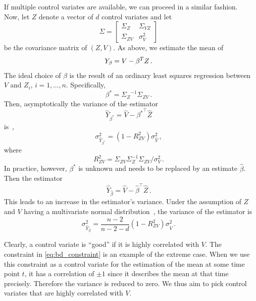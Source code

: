 If multiple control variates are available, we can proceed in a similar fashion.
Now, let ${Z}$ denote a vector of $d$ control variates and let
\[
\Sigma=
\begin{bmatrix}
\Sigma_{ Z} & \Sigma_{V Z}\\
\Sigma_{ Z V} & \sigma_V^2
\end{bmatrix}
\]
be the covariance matrix of $({Z},V)$.
As above, we estimate the mean of
\[
    {Y}_{\beta}=V -{\beta}^{T}{Z}\,.
    \]
The ideal choice of $\beta$ is the result of an ordinary least squares regression between $V$
and $Z_i$, $i=1,\dots,n$.
Specifically,
\[
	\beta^{*}={\Sigma_{ Z}}^{-1}{\Sigma}_{ Z V}\,.
\]
Then, asymptotically
the variance of the estimator
\begin{equation}
\hat{Y}_{{\beta^*}}=\hat{V}-{\beta^*}^{\top}\hat{ Z}
\end{equation}
is~\parencite{szechtman2003control},
\begin{equation}\label{eq:lcv_asym}
    {\sigma_{\hat Y_{\beta^*}}^2} = (1 - R_{ Z V}^2){\sigma_{\hat V}^2}\,,
\end{equation}
where
\begin{equation*}
    R_{ Z V}^2=\Sigma_{ Z V}\Sigma_{ Z}^{-1}\Sigma_{ Z V} / \sigma_V^2\,.
\end{equation*}
In practice, however, $\beta^*$ is unknown and needs to be replaced by
an estimate $\hat{\beta}$.
Then the estimator
\begin{equation}
\hat{Y}_{\hat{\beta}}=\hat{V}-\hat{\beta}^{\top}\hat{ Z}\,.
\end{equation}
This leads to an increase in the estimator's variance.
Under the assumption of $Z$ and $V$ having a multivariate normal
distribution~\parencite{cheng1978analysis,lavenberg1982statistical}, the variance of the estimator is
\begin{equation}\label{eq:lcv_norm_varred}
    {\sigma_{\hat{Y}_{\hat{\beta}}}^2} = \frac{n - 2}{n - 2 - d}(1 - R_{ ZV}^2){\sigma_{\hat V}^2}\,.
\end{equation}

Clearly, a control  variate is ``good'' if it is highly correlated with $V$.
The constraint in \eqref{eq:bd_constraint} is an example of the extreme case.
When we use this constraint as a control variate
for the estimation of the mean at some time point $t$, it has a correlation of $\pm1$
since it describes the mean at that time precisely.
Therefore the variance is reduced to zero.
We thus aim to pick control  variates that are highly correlated with $V$.

